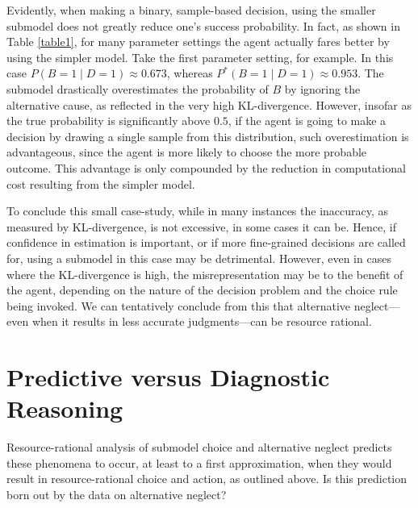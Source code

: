 \documentclass[10pt,letterpaper]{article}
\begin{document}
Evidently, when making a binary, sample-based decision, using the smaller submodel does not greatly reduce one's success probability. In fact, as shown in Table \ref{table1}, for many parameter settings the agent actually fares better by using the simpler model. Take the first parameter setting, for example. In this case $P(B=1\mid D=1) \approx 0.673$, whereas $P^*(B=1 \mid D=1) \approx 0.953$. The submodel drastically overestimates the probability of $B$ by ignoring the alternative cause, as reflected in the very high KL-divergence. However, insofar as the true probability is significantly above $0.5$, if the agent is going to make a decision by drawing a single sample from this distribution, such overestimation is advantageous, since the agent is more likely to choose the more probable outcome. This advantage is only compounded by the reduction in computational cost resulting from the simpler model.

To conclude this small case-study, while in many instances the inaccuracy, as measured by KL-divergence, is not excessive, in some cases it can be. Hence, if confidence in estimation is important, or if more fine-grained decisions are called for, using a submodel in this case may be detrimental. However, even in cases where the KL-divergence is high, the misrepresentation may be to the benefit of the agent, depending on the nature of the decision problem and the choice rule being invoked. We can tentatively conclude from this that alternative neglect---even when it results in less accurate judgments---can be resource rational. 

\section{Predictive versus Diagnostic Reasoning}

Resource-rational analysis of submodel choice and alternative neglect predicts these phenomena to occur, at least to a first approximation, when they would result in resource-rational choice and action, as outlined above. Is this prediction born out by the data on alternative neglect?
\end{document}

